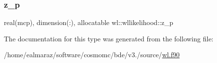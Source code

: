 \mbox{\label{structwl_1_1wllikelihood_ad2fdfc1eec8b08f6b5b70315922f7c43}} 
\subsubsection{\texorpdfstring{z\+\_\+p}{z\_p}}
{\footnotesize\ttfamily real(mcp), dimension(\+:), allocatable wl\+::wllikelihood\+::z\+\_\+p\hspace{0.3cm}{\ttfamily [private]}}



The documentation for this type was generated from the following file\+:\begin{DoxyCompactItemize}
\item 
/home/ealmaraz/software/cosmomc/bde/v3./source/\mbox{\hyperlink{wl_8f90}{wl.\+f90}}\end{DoxyCompactItemize}
